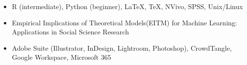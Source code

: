 


 \begin{small} \color{black} 
 \begin{itemize}
     \item[] R (intermediate), Python (beginner), \textrm{\LaTeX}, \textrm{\TeX}, NVivo, SPSS, Unix/Linux 
 \end{itemize}

\end{small}


 \begin{small} \color{black}
 \begin{itemize}
     \item[] Empirical Implications of Theoretical Models(EITM) for Machine Learning: Applications in Social Science Research
 \end{itemize}
\end{small}

 \begin{small} \color{black} 
 \begin{itemize}
     \item[] Adobe Suite (Illustrator, InDesign, Lightroom, Photoshop), CrowdTangle, Google Workspace, Microsoft 365
 \end{itemize}
 
\end{small}


